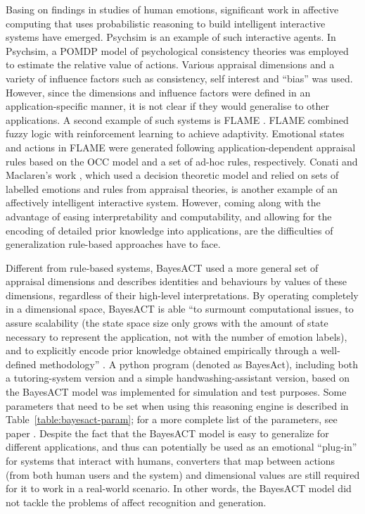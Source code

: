 Basing on findings in studies of human emotions, significant work in affective computing that uses probabilistic reasoning to build intelligent interactive systems have emerged. Psychsim \cite{pynadath2005psychsim} is an example of such interactive agents. In Psychsim, a POMDP model of psychological consistency theories was employed to estimate the relative value of actions. Various appraisal dimensions and a variety of influence factors such as consistency, self interest and ``bias'' was used. However, since the dimensions and influence factors were defined in an application-specific manner, it is not clear if they would generalise to other applications. A second example of such systems is FLAME \cite{el2000flame}. FLAME combined fuzzy logic with reinforcement learning to achieve adaptivity. Emotional states and actions in FLAME were generated following application-dependent appraisal rules based on the OCC model \cite{ortony1990cognitive} and a set of ad-hoc rules, respectively. Conati and Maclaren's work \cite{conati2009empirically}, which used a decision theoretic model and relied on sets of labelled emotions and rules from appraisal theories, is another example of an affectively intelligent interactive system. However, coming along with the advantage of easing interpretability and computability, and allowing for the encoding of detailed prior knowledge into applications, are the difficulties of generalization rule-based approaches have to face.

Different from rule-based systems, BayesACT \cite{hoey2013bayesian} used a more general set of appraisal dimensions and describes identities and behaviours by values of these dimensions, regardless of their high-level interpretations. By operating completely in a dimensional space, BayesACT is able ``to surmount computational issues, to assure scalability (the state space size only grows with the amount of state necessary to represent the application, not with the number of emotion labels), and to explicitly encode prior knowledge obtained empirically through a well-defined methodology'' \cite{hoey2013bayesian}. A python program (denoted as BayesAct), including both a tutoring-system version and a simple handwashing-assistant version, based on the BayesACT model was implemented for simulation and test purposes. Some parameters that need to be set when using this reasoning engine is described in Table~\ref{table:bayesact-param}; for a more complete list of the parameters, see paper \cite{hoey2013bayesian}. Despite the fact that the BayesACT model is easy to generalize for different applications, and thus can potentially be used as an emotional ``plug-in'' for systems that interact with humans, converters that map between actions (from both human users and the system) and dimensional values are still required for it to work in a real-world scenario. In other words, the BayesACT model did not tackle the problems of affect recognition and generation.

